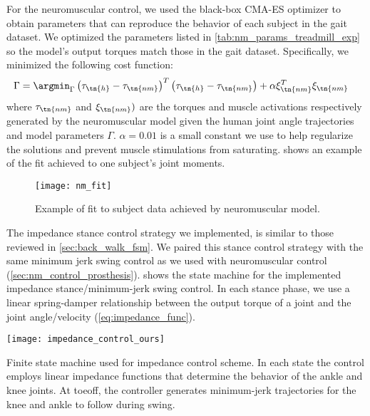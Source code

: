 For the neuromuscular control, we used the black-box CMA-ES optimizer
\citep{hansen2006cma} to obtain parameters that can reproduce the behavior of
each subject in the gait dataset. We optimized the parameters listed in
\cref{tab:nm_params_treadmill_exp} so the model's output torques match those in
the gait dataset. Specifically, we minimized the following cost function:
\begin{align}
    \Gamma &= \argmin_\Gamma \left(\tau_\tn{h} - \tau_\tn{nm} \right)^T
    \left(\tau_\tn{h} - \tau_\tn{nm} \right) + \alpha \xi_\tn{nm}^T \xi_\tn{nm}
\end{align}
where $\tau_\tn{nm}$ and  $\xi_\tn{nm})$ are the torques and muscle activations
respectively generated by the neuromuscular model given the human joint angle
trajectories and model parameters $\Gamma$. $\alpha = 0.01$ is a small constant
we use to help regularize the solutions and prevent muscle stimulations from
saturating.  shows an example of the fit achieved to
one subject's joint moments.
\begin{figure}[b]
    \centering 
    \texttt{[image: nm\_fit]}
    \caption{Example of fit to subject data achieved by neuromuscular
    model.}\label{fig:treadmill_nm_fit}
\end{figure}

The impedance stance control strategy we implemented, is similar to those
reviewed in \cref{sec:back_walk_fsm}. We paired this stance control strategy
with the same minimum jerk swing control as we used with neuromuscular control
(\cref{sec:nm_control_prosthesis}).  shows the
state machine for the implemented impedance stance/minimum-jerk swing control.
In each stance phase, we use a linear spring-damper relationship between the
output torque of a joint and the joint angle/velocity
(\cref{eq:impedance_func}).
\begin{marginfigure}
    \centering
    \texttt{[image: impedance\_control\_ours]}
    \caption[Finite state machine used for impedance control scheme]{Finite
    state machine used for impedance control scheme. In each state the control
    employs linear impedance functions that determine the behavior of the ankle
    and knee joints. At toeoff, the controller generates minimum-jerk
    trajectories for the knee and ankle to follow during
    swing.}\label{fig:impedance_control_ours}
\end{marginfigure}

